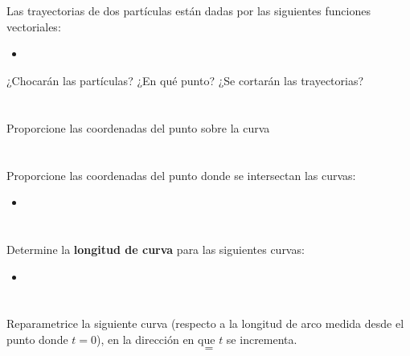 \documentclass[12pt]{article}
\begin{document}
\section{}
Las trayectorias de dos partículas están dadas por las siguientes funciones vectoriales:
\begin{itemize}[format=\textbf]

\item 

\end{itemize}
¿Chocarán las partículas? ¿En qué punto? ¿Se cortarán las trayectorias?

\section{}
Proporcione las coordenadas del punto sobre la curva

\section{}
Proporcione las coordenadas del punto donde se intersectan las curvas:
\begin{itemize}[format=\textbf]

\item 

\end{itemize}

\section{}
Determine la \textbf{longitud de curva} para las siguientes curvas:
\begin{itemize}[format=\textbf]

\item 

\end{itemize}

\section{}
Reparametrice la siguiente curva (respecto a la longitud de arco medida desde el punto donde $t = 0$), en la dirección en que $t$ se incrementa.
$$ = $$
\end{document}
